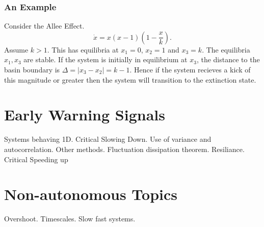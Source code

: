 \subsubsection{An Example}
Consider the Allee Effect.
\begin{equation}
  \label{eq:allee_effect}
  \dot{x} = x\left(x-1\right)\left(1-\frac{x}{k}\right).
\end{equation}
Assume $k > 1$. This has equilibria at $x_1 = 0$, $x_2 = 1$ and $x_3 = k$. The equilibria $x_1,x_3$ are stable. If the system is
initially in equilibrium at $x_3$, the distance to the basin boundary is $\Delta = |x_3 - x_2| = k - 1$. Hence if the system recieves a kick of
this magnitude or greater then the system will transition to the extinction state.


\section{Early Warning Signals}
Systems behaving 1D. Critical Slowing Down. Use of variance and
autocorrelation. Other methods. Fluctuation dissipation theorem.
Resiliance. Critical Speeding up


\section{Non-autonomous Topics}
Overshoot. Timescales. Slow fast systems.